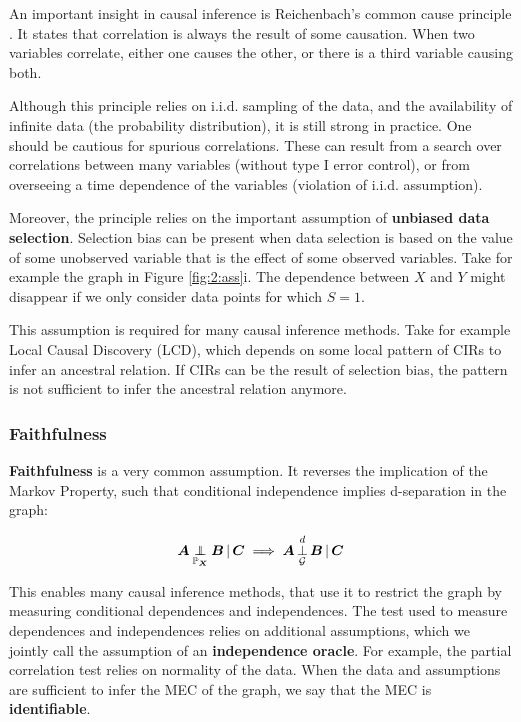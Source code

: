 An important insight in causal inference is Reichenbach's common cause principle \citep{reichenbach1956direction}. It states that correlation is always the result of some causation. When two variables correlate, either one causes the other, or there is a third variable causing both. 

Although this principle relies on i.i.d. sampling of the data, and the availability of infinite data (the probability distribution), it is still strong in practice. One should be cautious for spurious correlations. These can result from a search over correlations between many variables (without type I error control), or from overseeing a time dependence of the variables (violation of i.i.d. assumption). 

Moreover, the principle relies on the important assumption of \textbf{unbiased data selection}. Selection bias can be present when data selection is based on the value of some unobserved variable that is the effect of some observed variables. Take for example the graph in Figure \ref{fig:2:ass}i. The dependence between $X$ and $Y$ might disappear if we only consider data points for which $S=1$. 

This assumption is required for many causal inference methods. Take for example Local Causal Discovery (LCD), which depends on some local pattern of CIRs to infer an ancestral relation. If CIRs can be the result of selection bias, the pattern is not sufficient to infer the ancestral relation anymore.


\subsubsection{Faithfulness}

\textbf{Faithfulness} is a very common assumption. It reverses the implication of the Markov Property, such that conditional independence implies d-separation in the graph:

$$\indep{\B{A}}{\B{B}}{\B{C}}{\Prb_{\B{X}}} \implies \dsep{\B{A}}{\B{B}}{\B{C}}{\C{G}}$$


This enables many causal inference methods, that use it to restrict the graph by measuring conditional dependences and independences. The test used to measure dependences and independences relies on additional assumptions, which we jointly call the assumption of an \textbf{independence oracle}. For example, the partial correlation test relies on normality of the data. When the data and assumptions are sufficient to infer the MEC of the graph, we say that the MEC is \textbf{identifiable}.

